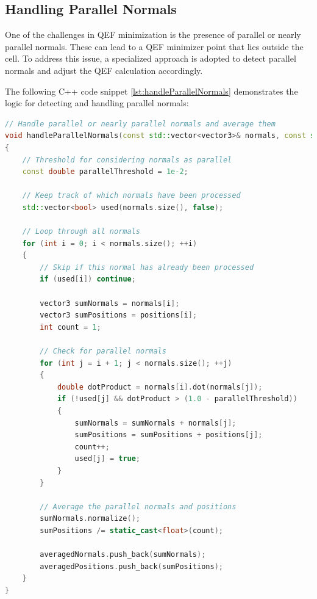 \subsection{Handling Parallel Normals}
One of the challenges in QEF minimization is the presence of parallel or nearly parallel normals. These can lead to a QEF minimizer point that lies outside the cell. To address this issue, a specialized approach is adopted to detect parallel normals and adjust the QEF calculation accordingly.

The following C++ code snippet \ref{lst:handleParallelNormals} demonstrates the logic for detecting and handling parallel normals:

\vspace{2mm}
\begin{lstlisting}[language=C++, caption=Logic for detecting and handling parallel normals, label=lst:handleParallelNormals]
// Handle parallel or nearly parallel normals and average them
void handleParallelNormals(const std::vector<vector3>& normals, const std::vector<vector3>& positions, std::vector<vector3>& averagedNormals, std::vector<vector3>& averagedPositions)
{
    // Threshold for considering normals as parallel
    const double parallelThreshold = 1e-2;  
    
    // Keep track of which normals have been processed
    std::vector<bool> used(normals.size(), false);  

    // Loop through all normals
    for (int i = 0; i < normals.size(); ++i)
    {
        // Skip if this normal has already been processed
        if (used[i]) continue;  

        vector3 sumNormals = normals[i];
        vector3 sumPositions = positions[i];
        int count = 1;

        // Check for parallel normals
        for (int j = i + 1; j < normals.size(); ++j)
        {
            double dotProduct = normals[i].dot(normals[j]);
            if (!used[j] && dotProduct > (1.0 - parallelThreshold))
            {
                sumNormals = sumNormals + normals[j];
                sumPositions = sumPositions + positions[j];
                count++;
                used[j] = true;
            }
        }

        // Average the parallel normals and positions
        sumNormals.normalize();
        sumPositions /= static_cast<float>(count);

        averagedNormals.push_back(sumNormals);
        averagedPositions.push_back(sumPositions);
    }
}
\end{lstlisting}


